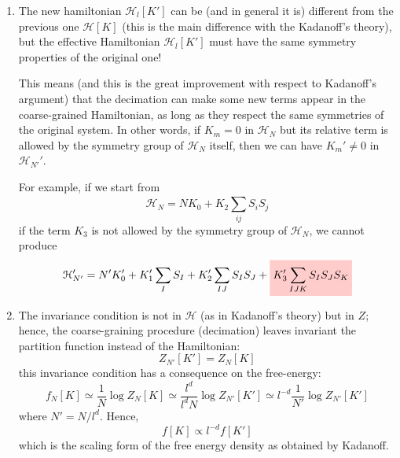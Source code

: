 \documentclass[../../Main/Main.tex]{subfiles}
\begin{document}
\begin{enumerate}
\item The new hamiltonian \( \mathcal{H}_l [K'] \) can be (and in general it is) different from the previous one \( \mathcal{H} [K] \) (this is the main difference with the Kadanoff's theory), but the effective Hamiltonian \(  \mathcal{H}_l [K']\)  must have the same symmetry properties of the original one!

This means (and this is the great improvement with respect to Kadanoff's argument) that the decimation can make some new terms appear in the coarse-grained Hamiltonian, as long as they respect the same symmetries of the original system. In other words, if \( K_m=0 \)  in \( \mathcal{H}_N \)  but its relative term is allowed by the symmetry group of \( \mathcal{H}_N \)  itself, then we can have \( K_m' \neq 0 \) in \( \mathcal{H}_{N'}' \).

For example, if we start from
\begin{equation*}
  \mathcal{H}_N = N K_0 + K_2 \sum_{ij}^{} S_i S_j
\end{equation*}
if the term \( K_3 \) is not allowed by the symmetry group of \( \mathcal{H}_N \), we cannot produce
\begin{equation*}
  \mathcal{H}_{N'}' = N' K_0' + K_1' \sum_{I}^{} S_I + K_2' \sum_{IJ}^{} S_I S_J
  + \mathcolorbox{red!20}{ K_3' \sum_{IJK}^{} S_I S_J S_K}
\end{equation*}

\item The invariance condition is not in \( \mathcal{H} \) (as in Kadanoff's theory) but in \( Z \); hence, the coarse-graining procedure (decimation) leaves invariant the partition function instead of the Hamiltonian:
\begin{equation}
  Z_{N'} [K'] = Z_N [K]
  \label{eq:20_2}
\end{equation}
this invariance condition has a consequence on the free-energy:
  \begin{equation*}
  f_N [K]  \simeq \frac{1}{N} \log{Z_N [K]} \simeq \frac{l^d}{l^d N} \log{Z_{N'}[K']} \simeq l^{-d} \frac{1}{N'} \log{Z_{N'}} [K']
\end{equation*}
where \( N' = N/l^d \).
Hence,
\begin{equation}
  f [K] \propto l^{-d} f [K']
\end{equation}
which is the scaling form of the free energy density as obtained by Kadanoff.

\end{enumerate}
\end{document}
